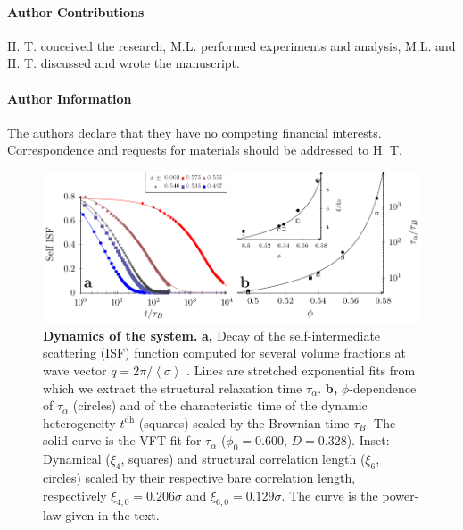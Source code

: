 \paragraph*{\bf Author Contributions}
H. T. conceived the research, M.L. performed experiments and analysis, M.L. and H. T. discussed and wrote the manuscript.

\paragraph*{\bf Author Information} 
The authors declare that they have no competing financial interests. 
Correspondence and requests for materials should be addressed to 
H. T. 

\clearpage

\begin{figure}
\begin{center}
\includegraphics{generate_figures-figure0.pdf}
\end{center}
\caption{\textbf{Dynamics of the system.} {\bf a,} Decay of the self-intermediate scattering (ISF) function computed for several volume fractions at wave vector $q=2\pi/\left\langle \sigma\right\rangle$ . Lines are stretched exponential fits from which we extract the structural relaxation time $\tau_\alpha$. {\bf b,} $\phi$-dependence of $\tau_\alpha$ (circles) and of the characteristic time of the dynamic heterogeneity $t^\text{dh}$ (squares) scaled by the Brownian time $\tau_B$. The solid curve is the VFT fit for $\tau_\alpha$ ($\phi_0=0.600$, $D=0.328$). Inset: Dynamical ($\xi_4$, squares) and structural correlation length ($\xi_6$, circles) scaled by their respective bare correlation length, respectively $\xi_{4,0}=0.206\sigma$ and $\xi_{6,0}=0.129\sigma$. The curve is the power-law given in the text.}
	\label{fig:vft}
\end{figure}

\clearpage

